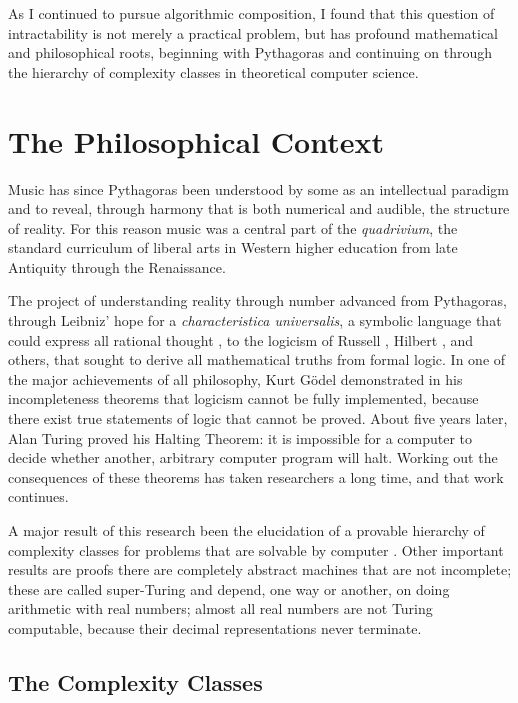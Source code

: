 \documentclass[11pt]{scrartcl}
\begin{document}
As I continued to pursue algorithmic composition, I found that this question of intractability is not merely a practical problem, but has profound mathematical and philosophical roots, beginning with Pythagoras and continuing on through the hierarchy of complexity classes in theoretical computer science.

\section*{The Philosophical Context}

Music has since Pythagoras \parencite{sep-pythagoras, huffman2014history} been understood by some as an intellectual paradigm and to reveal, through harmony that is both numerical and audible, the structure of reality. For this reason music was a central part of the \emph{quadrivium}, the standard curriculum of liberal arts in Western higher education from late Antiquity through the Renaissance.

The project of understanding reality through number advanced from Pythagoras, through Leibniz' 
hope for a \emph{characteristica universalis}, a symbolic language that could express all rational thought \parencite{davis2018universal}, to the logicism of Russell \parencite{sep-logicism}, Hilbert \parencite{sep-hilbert-program}, and others, that sought to derive all mathematical truths from formal logic. In one of the major achievements of all philosophy, Kurt Gödel \parencite{godel1986} demonstrated in his incompleteness theorems that logicism cannot be fully implemented, because there exist true statements of logic that cannot  be proved. About five years later, Alan Turing proved his Halting Theorem: it is impossible for a computer to decide whether another, arbitrary computer program will halt. Working out the consequences of these theorems has taken researchers a long time, and that work continues. 

A major result of this research been the elucidation of a provable hierarchy of complexity classes for problems that are solvable by computer \parencite{arora2009computational}. Other important results are proofs there are completely abstract machines that are not incomplete; these are called super-Turing and depend, one way or another, on doing arithmetic with real numbers; almost all real numbers are not Turing computable, because their decimal representations never terminate. 

 \subsection*{The Complexity Classes} \label{sec:complexity}
 
\end{document}
